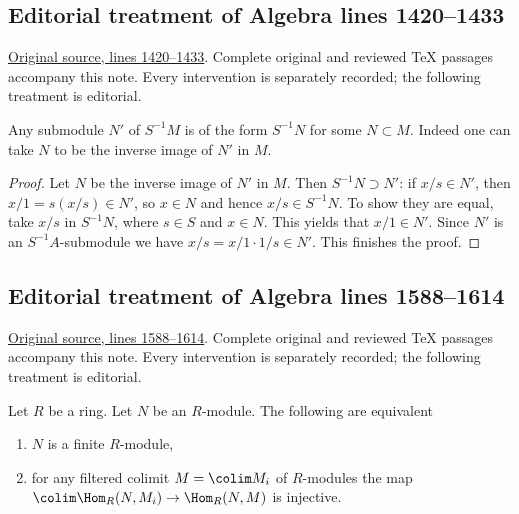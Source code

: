 \subsection{Editorial treatment of Algebra lines 1420--1433}

\hypertarget{algebra-context-003}{}

\noindent\href{https://github.com/stacks/stacks-project/blob/a04446e57ec1fbc252a871afcec7752fb2807b14/algebra.tex\#L1420}{Original source, lines 1420--1433}. Complete original and reviewed TeX passages accompany this note. Every intervention is separately recorded; the following treatment is editorial.


\begin{lemma}
\label{editorial-source-lemma-submodule-localization}
Any submodule $N'$ of $S^{-1}M$ is of the form $S^{-1}N$ for some
$N\subset M$. Indeed one can take $N$ to be the inverse image of
$N'$ in $M$.
\end{lemma}

\begin{proof}
Let $N$ be the inverse image of $N'$ in $M$. Then $S^{-1}N\supset N'$:
if $x/s \in N'$, then $x/1 = s(x/s) \in N'$, so $x \in N$
and hence $x/s \in S^{-1}N$. To show they are equal, take $x/s$ in
$S^{-1}N$, where $s\in S$ and $x\in N$. This yields that $x/1\in
N'$. Since $N'$ is an $S^{-1}A$-submodule we have
$x/s = x/1\cdot 1/s\in N'$. This finishes the proof.
\end{proof}


\subsection{Editorial treatment of Algebra lines 1588--1614}

\hypertarget{algebra-context-004}{}

\noindent\href{https://github.com/stacks/stacks-project/blob/a04446e57ec1fbc252a871afcec7752fb2807b14/algebra.tex\#L1588}{Original source, lines 1588--1614}. Complete original and reviewed TeX passages accompany this note. Every intervention is separately recorded; the following treatment is editorial.


\begin{lemma}
\label{editorial-source-lemma-characterize-finite-module-hom}
Let $R$ be a ring. Let $N$ be an $R$-module. The following are equivalent
\begin{enumerate}
\item $N$ is a finite $R$-module,
\item for any filtered colimit $M = \colim M_i$ of $R$-modules the map
$\colim \Hom_R(N, M_i) \to \Hom_R(N, M)$ is injective.
\end{enumerate}
\end{lemma}

